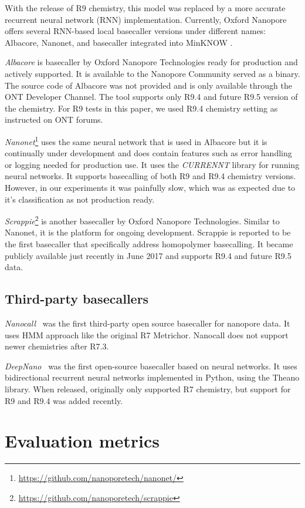 \documentclass[runningheads,a4paper]{llncs}
\begin{document}
With the release of R9 chemistry, this model was replaced by a more accurate recurrent neural network (RNN) implementation. Currently, Oxford Nanopore offers several RNN-based local basecaller versions under different names: Albacore, Nanonet, and basecaller integrated into MinKNOW \cite{ont-basecallers}.

\emph{Albacore} is basecaller by Oxford Nanopore Technologies ready for production and actively supported.
It is available to the Nanopore Community served as a binary. The source code of Albacore was not provided and is only available through the ONT Developer Channel. The tool supports only R9.4 and future R9.5 version of the chemistry. For R9 tests in this paper, we used R9.4 chemistry setting as instructed on ONT forums.

\emph{Nanonet}\footnote{\url{https://github.com/nanoporetech/nanonet/}} uses the same neural network that is used in Albacore but it is continually under development and does contain features such as error handling or logging needed for production use. It uses the \emph{CURRENNT} library for running neural networks. It supports basecalling of both R9 and R9.4 chemistry versions. However, in our experiments it was painfully slow, which was as expected due to it's classification as not production ready.

\emph{Scrappie}\footnote{\url{https://github.com/nanoporetech/scrappie}} is another basecaller by Oxford Nanopore Technologies. Similar to Nanonet, it is the platform for ongoing development. Scrappie is reported to be the first basecaller  that specifically address homopolymer basecalling. It became publicly available just recently in June 2017 and supports R9.4 and future R9.5 data.

\subsection{Third-party basecallers}
\emph{Nanocall}~\cite{David046086} was the first third-party open source basecaller for nanopore data. It uses HMM approach like the original R7 Metrichor. Nanocall does not support newer chemistries after R7.3.

\emph{DeepNano}~\cite{Boza2017}  was the first open-source basecaller based on neural networks. It uses bidirectional recurrent neural networks implemented in Python, using the Theano library. When released, originally only supported R7 chemistry, but support for R9 and R9.4 was added recently.

\section{Evaluation metrics}
\end{document}
